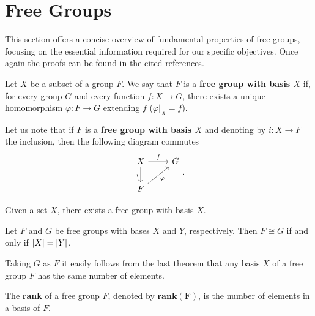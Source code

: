 \section{Free Groups}

This section offers a concise overview of fundamental properties of free groups, focusing on the essential information required for our specific objectives. 
Once again the proofs can be found in the cited references.

\begin{definition}
    Let $X$ be a subset of a group $F$. We say that $F$ is a \textbf{free group with basis $X$} if, for every group $G$ and every function $f \colon X \rightarrow G$, there exists a unique homomorphism $\varphi \colon F \rightarrow G$ extending $f$ ($\varphi |_X = f$).
\end{definition}

Let us note that if $F$ is a \textbf{free group with basis $X$} and denoting by $i \colon X \rightarrow F$ the inclusion, then the following diagram commutes 
    \[\begin{tikzcd}
        X & G \\
        F
        \arrow["f", from=1-1, to=1-2]
        \arrow["i"', from=1-1, to=2-1]
        \arrow["\varphi"', from=2-1, to=1-2]
    \end{tikzcd}.\]

\begin{theorem}
    \cite[p.~344]{RotmanITG}
    Given a set $X$, there exists a free group with basis $X$.
\end{theorem}

\begin{theorem}
    \cite[p.~348]{RotmanITG}
    Let $F$ and $G$ be free groups with bases $X$ and $Y$, respectively. 
    Then $F \cong G$ if and only if $| X | = | Y |$. 
\end{theorem}

Taking $G$ as $F$ it easily follows from the last theorem that any basis $X$ of a free group $F$ has the same number of elements.

\begin{definition}
    The \textbf{rank} of a free group $F$, denoted by $\mathbf{rank(F)}$, is the number of elements in a basis of $F$. 
\end{definition}
